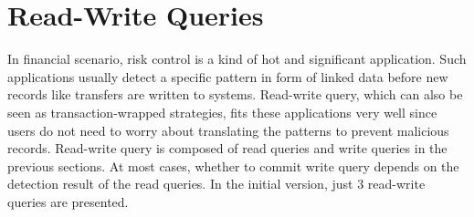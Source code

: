 
\section{Read-Write Queries}
\label{sec:rw-queries}

In financial scenario, risk control is a kind of hot and significant application.
Such applications usually detect a specific pattern in form of linked data before
new records like transfers are written to systems. Read-write query, which can also
be seen as transaction-wrapped strategies, fits these applications very well since
users do not need to worry about translating the patterns to prevent malicious records.
Read-write query is composed of read queries and write queries in the previous sections.
At most cases, whether to commit write query depends on the detection result of the
read queries. In the initial version, just 3 read-write queries are presented.



